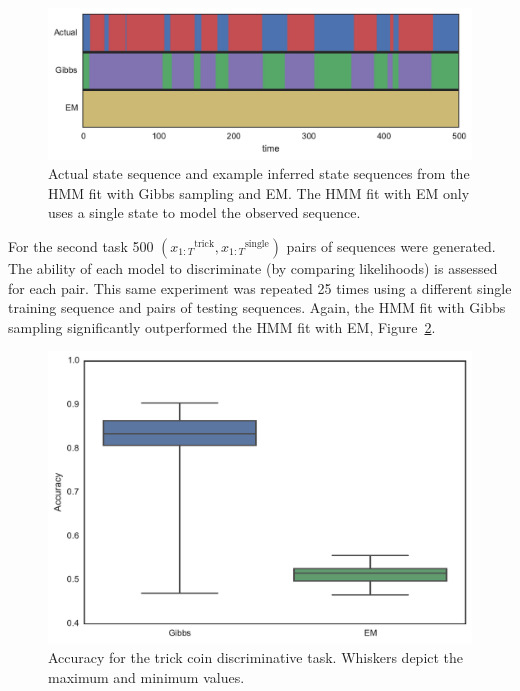 \documentclass[12pt]{report}
\newcommand{\1}[0]{\mathbbm{1}}
\newcommand{\seq}[3]{\ensuremath{#1_{{#2}:{#3}}}}
\begin{document}
\begin{figure}[H]
    \centering
    \includegraphics[width=1\textwidth]{img/trick_coin_states.pdf}
    \caption[Inferred states from trick coin example]{
        Actual state sequence and example inferred state sequences from the
        HMM fit with Gibbs sampling and EM. The HMM fit with EM
        only uses a single state to model the observed sequence.
    }
    \label{fig:trick-coin-states}
\end{figure}

For the second task 500 $(\seq{x}{1}{T}^{\text{trick}}, \seq{x}{1}{T}^\text{single})$ pairs
of sequences were generated. The ability of each model to discriminate (by comparing likelihoods)
is assessed for each pair. This same experiment was repeated 25 times using a different single
training sequence and pairs of testing sequences. Again, the \ac{HMM} fit with Gibbs sampling
significantly outperformed the \ac{HMM} fit with \ac{EM}, Figure~\ref{fig:trick-coin-disc}.

\begin{figure}[H]
    \centering
    \includegraphics[width=1\textwidth]{img/trick_coin_disc_accuracy.pdf}
    \caption[Trick coin accuracy]{
        Accuracy for the trick coin discriminative task. Whiskers
        depict the maximum and minimum values.
    }
    \label{fig:trick-coin-disc}
\end{figure}
\end{document}

